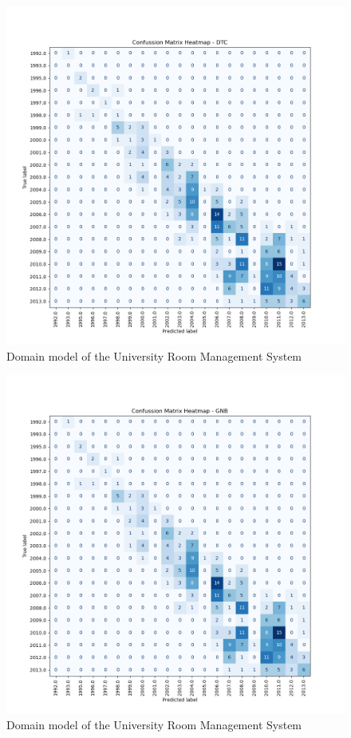 \documentclass[conference,onecolumn]{IEEEtran}
\begin{document}
    \begin{figure}[H]
		\centering
		\includegraphics[width=1\textwidth]{Plots/CM_Heatmap_DTC.png}
		\caption{Domain model of the University Room Management System}
		\label{appdx:cmheatmapdtc}
	\end{figure}
	\begin{figure}[H]
		\centering
		\includegraphics[width=1\textwidth]{Plots/CM_Heatmap_GNB.png}
		\caption{Domain model of the University Room Management System}
		\label{appx:cmheatmapgnb}
	\end{figure}
\end{document}
